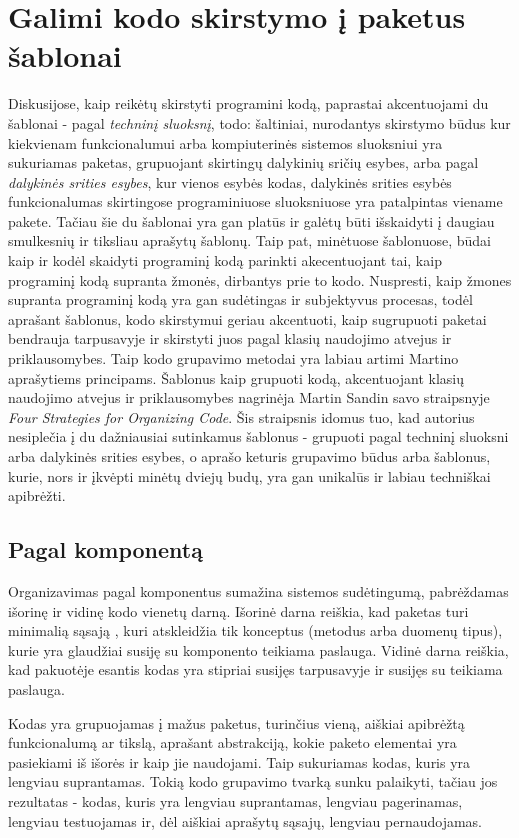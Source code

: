 \section{Galimi kodo skirstymo į paketus šablonai}
Diskusijose, kaip reikėtų skirstyti programini kodą, paprastai akcentuojami du šablonai - pagal \textit{techninį sluoksnį}, todo: šaltiniai, nurodantys skirstymo būdus
kur kiekvienam funkcionalumui arba kompiuterinės sistemos sluoksniui yra sukuriamas paketas,
grupuojant skirtingų dalykinių sričių esybes, arba pagal \textit{dalykinės srities esybes}, kur vienos esybės kodas, dalykinės srities
esybės funkcionalumas skirtingose programiniuose sluoksniuose yra patalpintas viename pakete.
Tačiau šie du šablonai yra gan platūs ir galėtų būti išskaidyti į daugiau smulkesnių ir tiksliau aprašytų šablonų.
Taip pat, minėtuose šablonuose, būdai kaip ir kodėl skaidyti programinį kodą parinkti akecentuojant tai, kaip programinį
kodą supranta žmonės, dirbantys prie to kodo.
Nuspresti, kaip žmones supranta programinį kodą yra gan sudėtingas ir subjektyvus procesas, todėl aprašant šablonus, kodo skirstymui
geriau akcentuoti, kaip sugrupuoti paketai bendrauja tarpusavyje ir skirstyti juos pagal klasių naudojimo atvejus ir priklausomybes.
Taip kodo grupavimo metodai yra labiau artimi Martino aprašytiems principams.
Šablonus kaip grupuoti kodą, akcentuojant klasių naudojimo atvejus ir priklausomybes nagrinėja Martin Sandin savo
straipsnyje \textit{Four Strategies for Organizing Code}.
Šis straipsnis idomus tuo, kad autorius nesiplečia į du dažniausiai sutinkamus šablonus - grupuoti pagal techninį sluoksni arba dalykinės srities esybes,
o aprašo keturis grupavimo būdus arba šablonus, kurie, nors ir įkvėpti minėtų dviejų budų, yra gan unikalūs ir labiau techniškai apibrėžti.


\subsection{Pagal komponentą}
Organizavimas pagal komponentus sumažina sistemos sudėtingumą, pabrėždamas išorinę ir vidinę kodo vienetų darną.
Išorinė darna reiškia, kad paketas turi minimalią sąsają , kuri atskleidžia tik konceptus (metodus arba duomenų tipus),
kurie yra glaudžiai susiję su komponento teikiama paslauga.
Vidinė darna reiškia, kad pakuotėje esantis kodas yra stipriai susijęs tarpusavyje ir susijęs su teikiama paslauga.

Kodas yra grupuojamas į mažus paketus, turinčius vieną, aiškiai apibrėžtą funkcionalumą ar tikslą, aprašant abstrakciją, kokie paketo elementai
yra pasiekiami iš išorės ir kaip jie naudojami.
Taip sukuriamas kodas, kuris yra lengviau suprantamas.
Tokią kodo grupavimo tvarką sunku palaikyti, tačiau jos rezultatas - kodas, kuris yra lengviau suprantamas, lengviau pagerinamas, lengviau testuojamas
ir, dėl aiškiai aprašytų sąsajų, lengviau pernaudojamas.

